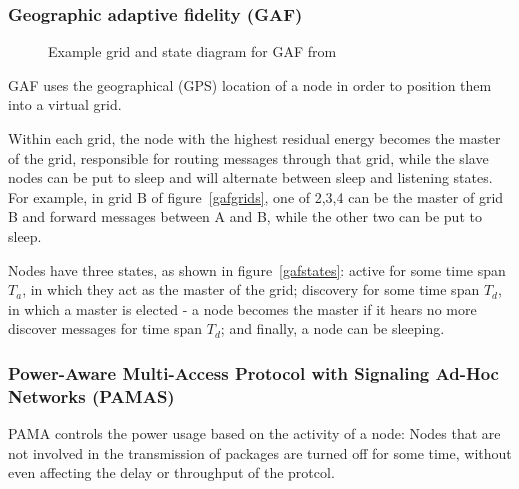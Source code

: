 \documentclass[conference]{IEEEtran}
\begin{document}
\subsubsection{Geographic adaptive fidelity (GAF)}
\begin{figure}[!t]
\hfill
{}
\caption{Example grid and state diagram for GAF from \cite{alotaibi2012survey}}
\end{figure}
GAF\cite{xu2001geography} uses the geographical (GPS) location of a node in
order to position them into a virtual grid.

Within each grid, the node with the highest residual energy becomes the master
of the grid, responsible for routing messages through that grid, while the
slave nodes can be put to sleep and will alternate between sleep and listening
states. For example, in grid B of figure~\ref{gafgrids}, one of 2,3,4 can be the
master of grid B and forward messages between A and B, while the other two can
be put to sleep.

Nodes have three states, as shown in figure~\ref{gafstates}: active for some time span $T_{a}$, in which they
act as the master of the grid; discovery for some time span $T_{d}$, in which a
master is elected - a node becomes the master if it hears no more discover messages
for time span $T_{d}$; and finally, a node can be sleeping.




\subsubsection{Power-Aware Multi-Access Protocol with Signaling Ad-Hoc Networks (PAMAS)}
PAMA\cite{singh1998pamas} controls the power usage based on the activity of
a node: Nodes that are not involved in the transmission of packages are turned
off for some time, without even affecting the delay or throughput of the
protcol.\cite{singh1998pamas} 
\end{document}
